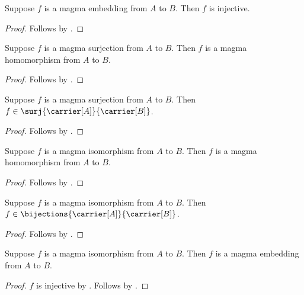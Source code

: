 \begin{proposition}\label{magma_embedding_injective}
    Suppose $f$ is a magma embedding from $A$ to $B$.
    Then $f$ is injective.
\end{proposition}
\begin{proof}
    Follows by .
\end{proof}

\begin{proposition}\label{magma_surjection_is_hom}
    Suppose $f$ is a magma surjection from $A$ to $B$.
    Then $f$ is a magma homomorphism from $A$ to $B$.
\end{proposition}
\begin{proof}
    Follows by .
\end{proof}

\begin{proposition}\label{magma_surjection_is_surjection}
    Suppose $f$ is a magma surjection from $A$ to $B$.
    Then $f\in\surj{\carrier[A]}{\carrier[B]}$.
\end{proposition}
\begin{proof}
    Follows by .
\end{proof}

\begin{proposition}\label{magma_isomorphism_is_hom}
    Suppose $f$ is a magma isomorphism from $A$ to $B$.
    Then $f$ is a magma homomorphism from $A$ to $B$.
\end{proposition}
\begin{proof}
    Follows by .
\end{proof}

\begin{proposition}\label{magma_isomorphism_is_bijection}
    Suppose $f$ is a magma isomorphism from $A$ to $B$.
    Then $f\in\bijections{\carrier[A]}{\carrier[B]}$.
\end{proposition}
\begin{proof}
    Follows by .
\end{proof}

\begin{corollary}\label{magma_isomorphism_is_embedding}
    Suppose $f$ is a magma isomorphism from $A$ to $B$.
    Then $f$ is a magma embedding from $A$ to $B$.
\end{corollary}
\begin{proof}
    $f$ is injective by
        .
    Follows by
        .
\end{proof}

